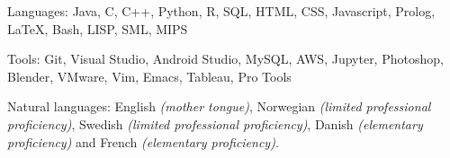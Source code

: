 \documentclass[11pt,letterpaper]{article}
\begin{document}

\spacedhrule{0.2em}{-0.8em} 



\inlineheadsection 
{Languages:}
{Java, C, C++, Python, R, SQL, HTML, CSS, Javascript, Prolog, {\LaTeX}, Bash, LISP, SML, MIPS}


\inlineheadsection 
{Tools:}
{Git, Visual Studio, Android Studio, MySQL, AWS, Jupyter, Photoshop, Blender, VMware, Vim, Emacs, Tableau, Pro Tools}


\inlineheadsection 
{Natural languages:}
{English \textit{(mother tongue)}, Norwegian \textit{(limited professional proficiency)}, Swedish \textit{(limited professional proficiency)}, Danish \textit{(elementary proficiency)} and French \textit{(elementary proficiency)}.}

\end{document}

